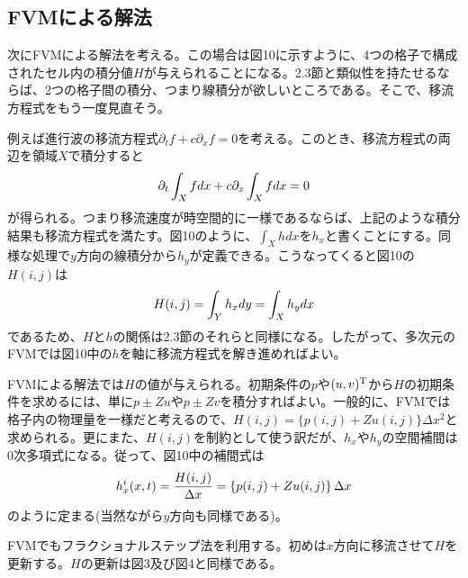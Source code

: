 \documentclass[dvipdfmx, 9pt, a4paper]{jsarticle}
\begin{document}
\subsection{FVMによる解法}
次にFVMによる解法を考える。この場合は図10に示すように、4つの格子で構成されたセル内の積分値$H$が与えられることになる。2.3節と類似性を持たせるならば、2つの格子間の積分、つまり線積分が欲しいところである。そこで、移流方程式をもう一度見直そう。\par
例えば進行波の移流方程式$\partial_tf+c\partial_xf=0$を考える。このとき、移流方程式の両辺を領域$X$で積分すると
\begin{equation}
\partial_t\int_Xfdx + c\partial_x\int_Xfdx = 0 \notag
\end{equation}
が得られる。つまり移流速度が時空間的に一様であるならば、上記のような積分結果も移流方程式を満たす。図10のように、$\int_X h dx$を$h_x$と書くことにする。同様な処理で$y$方向の線積分から$h_y$が定義できる。こうなってくると図10の$H(i, j)$は
\begin{equation}
H(i, j)=\int_Y h_xdy=\int_X h_ydx \notag
\end{equation}
であるため、$H$と$h$の関係は2.3節のそれらと同様になる。したがって、多次元のFVMでは図10中の$h$を軸に移流方程式を解き進めればよい。\par
FVMによる解法では$H$の値が与えられる。初期条件の$p$や$(u, v)^{\rm T}$から$H$の初期条件を求めるには、単に$p\pm Zu$や$p\pm Zv$を積分すればよい。一般的に、FVMでは格子内の物理量を一様だと考えるので、$H(i, j)=\{p(i, j)+Zu(i, j)\} \Delta x^2$と求められる。更にまた、$H(i, j)$を制約として使う訳だが、$h_x$や$h_y$の空間補間は0次多項式になる。従って、図10中の補間式は
\begin{equation}
h^i_x(x, t)=\frac{H(i, j)}{\Delta x}=\left\{p(i, j)+Zu(i, j)\right\} \Delta x \notag
\end{equation}
のように定まる(当然ながら$y$方向も同様である)。\par
FVMでもフラクショナルステップ法を利用する。初めは$x$方向に移流させて$H$を更新する。$H$の更新は図3及び図4と同様である。
\end{document}
